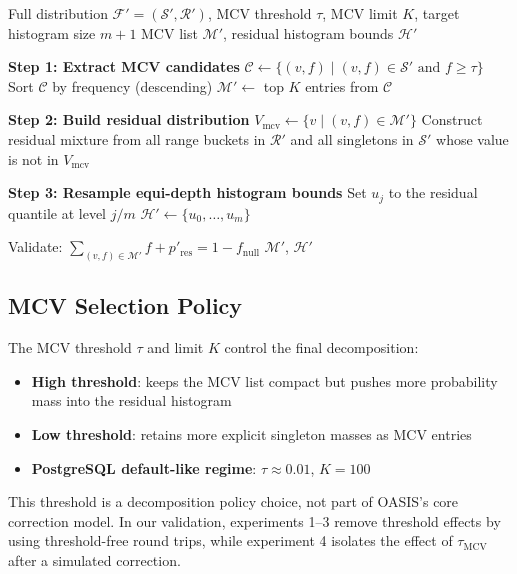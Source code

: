 \begin{algorithm}[H]
\caption{Decompose Canonical Full Distribution to PostgreSQL Statistics}
\label{alg:decompose}
\begin{algorithmic}[1]
\REQUIRE Full distribution $\mathcal{F}' = (\mathcal{S}', \mathcal{R}')$, MCV threshold $\tau$, MCV limit $K$, target histogram size $m{+}1$
\ENSURE MCV list $\mathcal{M}'$, residual histogram bounds $\mathcal{H}'$

\STATE \textbf{Step 1: Extract MCV candidates}
\STATE $\mathcal{C} \leftarrow \{(v, f) \mid (v, f) \in \mathcal{S}' \text{ and } f \geq \tau\}$
\STATE Sort $\mathcal{C}$ by frequency (descending)
\STATE $\mathcal{M}' \leftarrow$ top $K$ entries from $\mathcal{C}$

\STATE \textbf{Step 2: Build residual distribution}
\STATE $V_{\text{mcv}} \leftarrow \{v \mid (v, f) \in \mathcal{M}'\}$
\STATE Construct residual mixture from all range buckets in $\mathcal{R}'$ and all singletons in $\mathcal{S}'$ whose value is not in $V_{\text{mcv}}$

\STATE \textbf{Step 3: Resample equi-depth histogram bounds}
    \STATE Set $u_j$ to the residual quantile at level $j/m$
\ENDFOR
\STATE $\mathcal{H}' \leftarrow \{u_0, \ldots, u_m\}$

\STATE Validate: $\sum_{(v,f) \in \mathcal{M}'} f + p'_{\mathrm{res}} = 1 - f_{\mathrm{null}}$
\RETURN $\mathcal{M}'$, $\mathcal{H}'$
\end{algorithmic}
\end{algorithm}

\subsection{MCV Selection Policy}

The MCV threshold $\tau$ and limit $K$ control the final decomposition:
\begin{itemize}
    \item \textbf{High threshold}: keeps the MCV list compact but pushes more probability mass into the residual histogram
    \item \textbf{Low threshold}: retains more explicit singleton masses as MCV entries
    \item \textbf{PostgreSQL default-like regime}: $\tau \approx 0.01$, $K = 100$
\end{itemize}

This threshold is a decomposition policy choice, not part of OASIS's core
correction model. In our validation, experiments 1--3 remove threshold effects
by using threshold-free round trips, while experiment 4 isolates the effect of
$\tau_{\text{MCV}}$ after a simulated correction.


